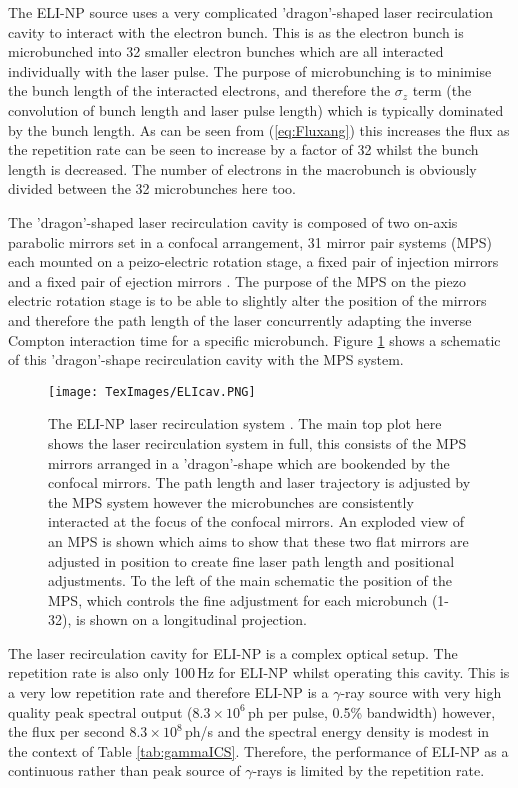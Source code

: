 \documentclass[11pt]{article}
\begin{document}
The ELI-NP source uses a very complicated 'dragon'-shaped laser recirculation cavity to interact with the electron bunch. This is as the electron bunch is microbunched into 32 smaller electron bunches which are all interacted individually with the laser pulse. The purpose of microbunching is to minimise the bunch length of the interacted electrons, and therefore the $\sigma_{z}$ term (the convolution of bunch length and laser pulse length) which is typically dominated by the bunch length. As can be seen from (\ref{eq:Fluxang}) this increases the flux as the repetition rate can be seen to increase by a factor of 32 whilst the bunch length is decreased. The number of electrons in the macrobunch is obviously divided between the 32 microbunches here too.

The 'dragon'-shaped laser recirculation cavity is composed of two on-axis parabolic mirrors set in a confocal arrangement, 31 mirror pair systems (MPS) each mounted on a peizo-electric rotation stage, a fixed pair of injection mirrors and a fixed pair of ejection mirrors \cite{ELIcav}. The purpose of the MPS on the piezo electric rotation stage is to be able to slightly alter the position of the mirrors and therefore the path length of the laser concurrently adapting the inverse Compton interaction time for a specific microbunch. Figure \ref{fig:ELIcav} shows a schematic of this 'dragon'-shape recirculation cavity with the MPS system.

\begin{figure}[H]
\centering
\texttt{[image: TexImages/ELIcav.PNG]}
\caption{\label{fig:ELIcav} The ELI-NP laser recirculation system \cite{ELI2016IPAC}. The main top plot here shows the laser recirculation system in full, this consists of the MPS mirrors arranged in a 'dragon'-shape which are bookended by the confocal mirrors. The path length and laser trajectory is adjusted by the MPS system however the microbunches are consistently interacted at the focus of the confocal mirrors. An exploded view of an MPS is shown which aims to show that these two flat mirrors are adjusted in position to create fine laser path length and positional adjustments. To the left of the main schematic the position of the MPS, which controls the fine adjustment for each microbunch (1-32), is shown on a longitudinal projection.}
\end{figure}

The laser recirculation cavity for ELI-NP is a complex optical setup. The repetition rate is also only 100\,Hz for ELI-NP \cite{ELINPFac} whilst operating this cavity. This is a very low repetition rate and therefore ELI-NP is a $\gamma$-ray source with very high quality peak spectral output ($8.3\times 10^{6}$\,ph per pulse, 0.5\% bandwidth) however, the flux per second $8.3\times 10^{8}$\,ph/s  and the spectral energy density is modest in the context of Table \ref{tab:gammaICS}. Therefore, the performance of ELI-NP as a continuous rather than peak source of $\gamma$-rays is limited by the repetition rate.
\end{document}
